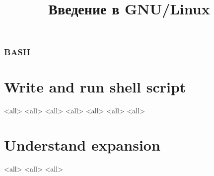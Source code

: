 
\title{Введение в GNU/Linux}




\begin{frame}
	\frametitle{BASH}
	\titlepage
	\vspace{-0.5cm}
	\begin{center}
	\end{center}
\end{frame}

\begin{frame}
	\tableofcontents
\end{frame}



\section{Write and run shell script}
\mode<all>{}
\mode<all>{}
\mode<all>{}
\mode<all>{}
\mode<all>{}
\mode<all>{}
\mode<all>{}



\section{Understand expansion}
\mode<all>{}
\mode<all>{}
\mode<all>{}

